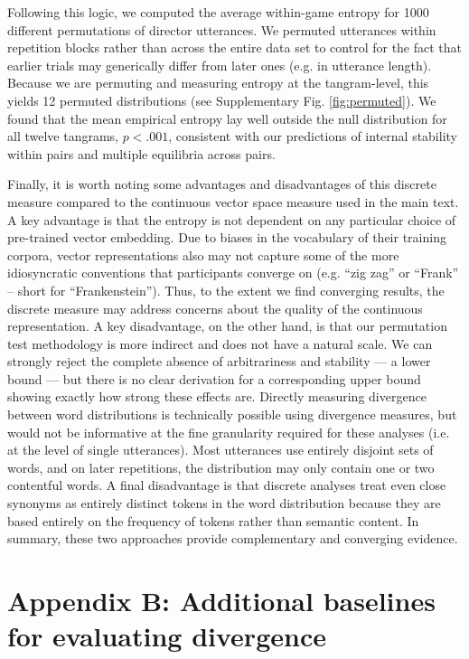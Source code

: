 \documentclass[alpha-refs]{wiley-article}
\begin{document}
Following this logic, we computed the average within-game entropy for 1000 different permutations of director utterances.
We permuted utterances within repetition blocks rather than across the entire data set to control for the fact that earlier trials may generically differ from later ones (e.g. in utterance length).
Because we are permuting and measuring entropy at the tangram-level, this yields 12 permuted distributions (see Supplementary Fig. \ref{fig:permuted}).
We found that the mean empirical entropy lay well outside the null distribution for all twelve tangrams, $p < .001$, consistent with our predictions of internal stability within pairs and multiple equilibria across pairs.

Finally, it is worth noting some advantages and disadvantages of this discrete measure compared to the continuous vector space measure used in the main text.
A key advantage is that the entropy is not dependent on any particular choice of pre-trained vector embedding.
Due to biases in the vocabulary of their training corpora, vector representations also may not capture some of the more idiosyncratic conventions that participants converge on (e.g.  ``zig zag'' or ``Frank'' -- short for ``Frankenstein'').
Thus, to the extent we find converging results, the discrete measure may address concerns about the quality of the continuous representation.
A key disadvantage, on the other hand, is that our permutation test methodology is more indirect and does not have a natural scale.
We can strongly reject the complete absence of arbitrariness and stability --- a lower bound --- but there is no clear derivation for a corresponding upper bound showing exactly how strong these effects are.
Directly measuring divergence between word distributions is technically possible using divergence measures, but would not be informative at the fine granularity required for these analyses (i.e. at the level of single utterances).
Most utterances use entirely disjoint sets of words, and on later repetitions, the distribution may only contain one or two contentful words.
A final disadvantage is that discrete analyses treat even close synonyms as entirely distinct tokens in the word distribution because they are based entirely on the frequency of tokens rather than semantic content.
In summary, these two approaches provide complementary and converging evidence.

\section*{Appendix B: Additional baselines for evaluating divergence}
\end{document}
